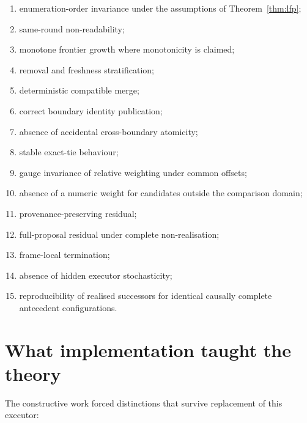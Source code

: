 \documentclass[11pt,a4paper]{article}
\theoremstyle{remark}
\begin{document}
\begin{enumerate}[leftmargin=*]
\item enumeration-order invariance under the assumptions of Theorem~\ref{thm:lfp};
\item same-round non-readability;
\item monotone frontier growth where monotonicity is claimed;
\item removal and freshness stratification;
\item deterministic compatible merge;
\item correct boundary identity publication;
\item absence of accidental cross-boundary atomicity;
\item stable exact-tie behaviour;
\item gauge invariance of relative weighting under common offsets;
\item absence of a numeric weight for candidates outside the comparison domain;
\item provenance-preserving residual;
\item full-proposal residual under complete non-realisation;
\item frame-local termination;
\item absence of hidden executor stochasticity;
\item reproducibility of realised successors for identical causally complete antecedent configurations.
\end{enumerate}

\section{What implementation taught the theory}\label{sec:lessons}

The constructive work forced distinctions that survive replacement of this executor:
\end{document}
